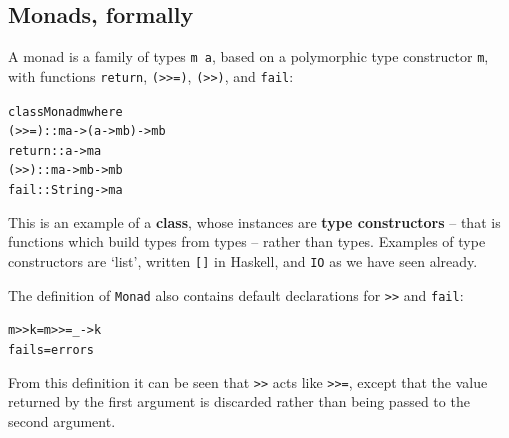 \subsection*{Monads, formally}
\minx{>>}

A monad is a family of types \texttt{m a}, based on a polymorphic type
constructor \texttt{m}, with functions \texttt{return}, \texttt{(>>=)},
\texttt{(>>)}, and \texttt{fail}:
\begin{alltt}
class Monad m where
  (>>=)  :: m a -> (a -> m b) -> m b
  return :: a -> m a
  (>>)   :: m a -> m b -> m b
  fail   :: String -> m a
\end{alltt}
This is an example of a \textbf{class}, whose instances are
\textbf{type constructors} -- that is functions which build types from
types -- rather than types. Examples of type constructors are `list',
written \texttt{[]} in Haskell, 
and \texttt{IO} as we have seen already.

The definition of \texttt{Monad} also contains default declarations for \texttt{>>} and \texttt{fail}:
\begin{alltt}
m >> k = m >>= \bs{}\_ -> k 
fail s = error s
\end{alltt}
From this definition it can be seen that \texttt{>>} acts like \texttt{>>=}, except that the value
returned by the first argument is discarded rather than being passed to the second argument.

